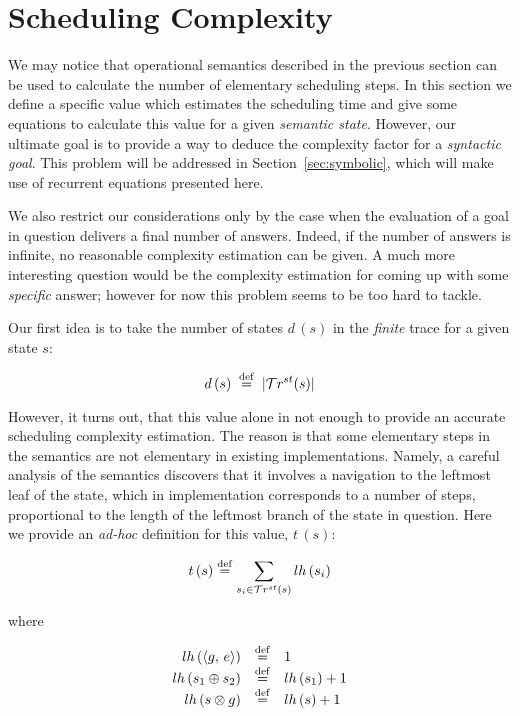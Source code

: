 \section{Scheduling Complexity}
\label{sec:scheduling}

We may notice that operational semantics described in the previous section can be used to calculate the number of elementary scheduling steps.
In this section we define a specific value which estimates the scheduling time and give some equations to calculate this value for a given \emph{semantic
state}. However, our ultimate goal is to provide a way to deduce the complexity factor for a \emph{syntactic goal}. This problem will be addressed in
Section~\ref{sec:symbolic}, which will make use of recurrent equations presented here.

We also restrict our considerations only by the case when the evaluation of a goal in question delivers a final number of answers. Indeed,
if the number of answers is infinite, no reasonable complexity estimation can be given. A much more interesting question would be
the complexity estimation for coming up with some \emph{specific} answer; however for now this problem seems to be too hard to
tackle.

Our first idea is to take the number of states $d\,(s)$ in the \emph{finite} trace for a given state $s$:

\[ d\,(s) \; \overset{\mathrm{def}}{=} \; | \mathcal{T}r^{st}(s) |  \]

However, it turns out, that this value alone in not enough to provide an accurate scheduling complexity estimation. The reason is that some
elementary steps in the semantics are not elementary in existing implementations. Namely, a careful analysis of the semantics discovers that
it involves a navigation to the leftmost leaf of the state, which in implementation corresponds to a number of
steps, proportional to the length of the leftmost branch of the state in question. Here we provide an \emph{ad-hoc} definition for this value, $t\,(s)$:

\[
t\,(s) \overset{\mathrm{def}}{=} \sum\limits_{s_i \in \mathcal{T}r^{st}(s)} lh\,(s_i) 
\]

where

\[
\begin{array}{rcl}
 lh\,(\langle g ,\, e \rangle)  &\overset{\mathrm{def}}{=}& 1 \\
 lh\,(s_1 \oplus s_2) &\overset{\mathrm{def}}{=}& lh\,(s_1) + 1 \\
 lh\,(s \otimes g)    &\overset{\mathrm{def}}{=}& lh\,(s) + 1 \\
\end{array}
\]


